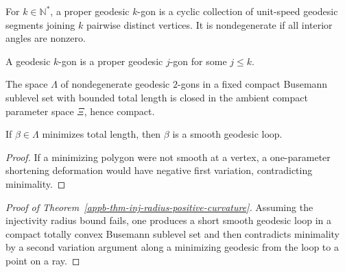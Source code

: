 \begin{definition}
\label{appb-def-proper-geodesic-k-gon}
For $k\in\mathbb N^*$, a proper geodesic $k$-gon is a cyclic collection of unit-speed geodesic segments joining $k$ pairwise distinct vertices. It is nondegenerate if all interior angles are nonzero.
\end{definition}

\begin{definition}
\label{appb-def-geodesic-k-gon}
A geodesic $k$-gon is a proper geodesic $j$-gon for some $j\le k$.
\end{definition}

\begin{lemma}
\label{appb-lem-polygon-space-compact}
The space $\Lambda$ of nondegenerate geodesic $2$-gons in a fixed compact Busemann sublevel set with bounded total length is closed in the ambient compact parameter space $\Xi$, hence compact.
\end{lemma}

\begin{lemma}
\label{appb-lem-minimizing-polygon-smooth}
If $\beta\in\Lambda$ minimizes total length, then $\beta$ is a smooth geodesic loop.
\end{lemma}

\begin{proof}
If a minimizing polygon were not smooth at a vertex, a one-parameter shortening deformation would have negative first variation, contradicting minimality.
\end{proof}

\begin{proof}[Proof of Theorem~\ref{appb-thm-inj-radius-positive-curvature}]
Assuming the injectivity radius bound fails, one produces a short smooth geodesic loop in a compact totally convex Busemann sublevel set and then contradicts minimality by a second variation argument along a minimizing geodesic from the loop to a point on a ray.
\end{proof}
